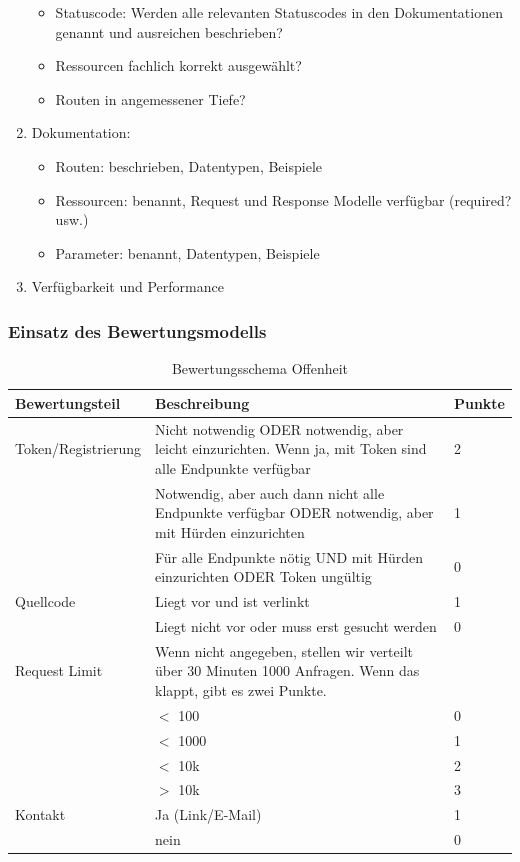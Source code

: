 \documentclass[notitlepage, hidelinks]{article}
\begin{document}
\begin{enumerate}
\begin{itemize}
\item Statuscode: Werden alle relevanten Statuscodes in den Dokumentationen genannt und ausreichen beschrieben?
\item Ressourcen fachlich korrekt ausgewählt?
\item Routen in angemessener Tiefe?
\end{itemize}
\item Dokumentation:
\begin{itemize}
\item Routen: beschrieben, Datentypen, Beispiele
\item Ressourcen: benannt, Request und Response Modelle verfügbar (required? usw.)
\item Parameter: benannt, Datentypen, Beispiele
\end{itemize}
\item Verfügbarkeit und Performance
\end{enumerate}


\subsubsection{Einsatz des Bewertungsmodells}

\begin{table}[H]
\begin{center}
\begin{tabular}{|p{3.6cm}|p{8.5cm}|p{2.5cm}|}
\hline
\textbf{Bewertungsteil} & \textbf{Beschreibung} & \textbf{Punkte}\\ \hline
Token/Registrierung & Nicht notwendig ODER notwendig, aber leicht einzurichten. Wenn ja, mit Token sind alle Endpunkte verfügbar & 2\\ \hline
& Notwendig, aber auch dann nicht alle Endpunkte verfügbar ODER notwendig, aber mit Hürden einzurichten & 1\\ \hline
& Für alle Endpunkte nötig UND mit Hürden einzurichten ODER Token ungültig & 0\\ \hline
Quellcode & Liegt vor und ist verlinkt & 1\\ \hline
& Liegt nicht vor oder muss erst gesucht werden & 0\\ \hline
Request Limit & Wenn nicht angegeben, stellen wir verteilt über 30 Minuten 1000 Anfragen. Wenn das klappt, gibt es zwei Punkte. & \\ \hline
& $<$ 100 & 0 \\ \hline
& $<$ 1000 & 1 \\ \hline
& $<$ 10k & 2 \\ \hline
& $>$ 10k & 3 \\ \hline
Kontakt & Ja (Link/E-Mail) & 1 \\ \hline
& nein & 0 \\ \hline
\end{tabular}
\caption{Bewertungsschema Offenheit}
\label{Offenheit}
\end{center}
\end{table}
\end{document}
